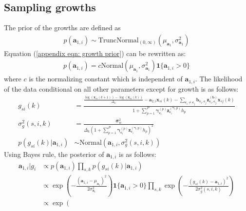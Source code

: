 \documentclass{article}
\newcommand{\Normaldist}{\text{Normal}}
\newcommand{\TruncNormaldist}[2]{\text{TruncNormal}_{(#1, #2)}}
\newcommand{\ci}[1]{\mathbf{c}_{#1}}
\newcommand{\growth}{\mathbf{a}_1}
\newcommand{\growthi}[1]{\mathbf{a}_{1,#1}}
\newcommand{\meangrowth}{\mu_{\growth}}
\newcommand{\vargrowth}{\sigma^2_{\growth}}
\newcommand{\sii}[1]{\mathbf{a}_{2,#1}}
\newcommand{\interact}{\mathbf{b}}
\newcommand{\interactcij}[2]{\interact_{\ci{#1}, \ci{#2}}}
\newcommand{\zinteractcij}[2]{\mathbf{z}^{(\interact)}_{\ci{#1}, \ci{#2}}}
\newcommand{\pert}{\mathbf{\gamma}}
\newcommand{\pertic}[2]{\mathbf{\gamma}^{(#1)}_{\ci{#2}}} %
\newcommand{\zpertic}[2]{\mathbf{z}^{(\pert, #1)}_{\ci{#2}}}
\newcommand{\stepperti}[1]{h_{#1}}
\newcommand{\pv}{\mathbf{\sigma}_w^2}
\newcommand{\varsik}[4]{#1_{#2 #3}(#4)}
\newcommand{\xsik}[3]{\mathbf{x}_{#1 #2}(#3)}
\newcommand{\dt}{\Delta_k}
\begin{document}
\begin{appendices}
\subsection{Sampling growths}
\label{appendix:sampling growth}
The prior of the growths are defined as
\begin{align}
    \label{appendix eqn: growth prior}
    p(\growthi{i}) \sim \TruncNormaldist{0}{\infty}(\meangrowth, \vargrowth)
\end{align}
Equation (\ref{appendix eqn: growth prior}) can be rewritten as:
\begin{align}
    p(\growthi{i}) = c \Normaldist (\meangrowth , \vargrowth) 
        \mathbf{1} \{ \growthi{i} > 0 \}
\end{align}
where $c$ is the normalizing constant which is independent of $\growthi{i}$. The likelihood of the data conditional on all other parameters except for growth is as follows:
\begin{align}
    \varsik{g}{s}{i}{k} & = 
        \frac{
            \frac
                {\log (\xsik{s}{i}{k+1}) - \log (\xsik{s}{i}{k}) }{\dt}
                - \sii{i} \xsik{s}{i}{k} 
                    - \sum_{\ci{i} \neq \ci{j}}
                        \interactcij{i}{j} 
                        \zinteractcij{i}{j}
                        \xsik{s}{j}{k}
        }
        {
            1 + \sum_{p=1}^P \pertic{p}{i} \zpertic{p}{i} \stepperti{p}
        } \\
    \sigma^2_g (s,i,k) & = \frac{\pv}
        {
            \dt
            \left( 1 + \sum_{p=1}^P \pertic{p}{i} \zpertic{p}{i} \stepperti{p} \right)^2
        }\\
    p(\varsik{g}{s}{i}{k} | \growthi{i}) & \sim  \Normaldist \left(
        \growthi{i}, \sigma^2_g (s,i,k)
    \right)
\end{align}
Using Bayes rule, the posterior of $\growthi{i}$ is as follows:
\begin{align}
    \label{eqn:derivation of truncated normal posterior}
    \growthi{i} | g_i 
        & \propto 
            p(\growthi{i})
            \prod_{s,k} p(\varsik{g}{s}{i}{k} | \growthi{i}) \\
        & \propto
            \exp \left(
                - \frac{(\growthi{i} - \meangrowth)^2}{2 \vargrowth}
            \right) \mathbf{1} \{ \growthi{i} > 0 \}
            \prod_{s,k}
            \exp \left(
                - \frac{(\varsik{g}{s}{i}{k} - \growthi{i})^2}
                    {2 \sigma^2_g (s,i,k)}
        \right) \\
        & \propto \exp \left(

\end{align}
\end{appendices}
\end{document}
